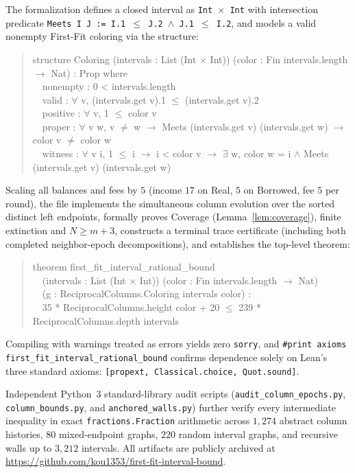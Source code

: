 \documentclass[11pt,a4paper]{article}
\theoremstyle{remark}
\begin{document}
The formalization defines a closed interval as \texttt{Int $\times$ Int} with intersection predicate \texttt{Meets I J := I.1 $\le$ J.2 $\wedge$ J.1 $\le$ I.2}, and models a valid nonempty First-Fit coloring via the structure:
\begin{quote}\small\ttfamily
structure Coloring (intervals : List (Int $\times$ Int)) (color : Fin intervals.length $\to$ Nat) : Prop where\\
\ \ nonempty : 0 < intervals.length\\
\ \ valid    : $\forall$ v, (intervals.get v).1 $\le$ (intervals.get v).2\\
\ \ positive : $\forall$ v, 1 $\le$ color v\\
\ \ proper   : $\forall$ v w, v $\ne$ w $\to$ Meets (intervals.get v) (intervals.get w) $\to$ color v $\ne$ color w\\
\ \ witness  : $\forall$ v i, 1 $\le$ i $\to$ i < color v $\to$ $\exists$ w, color w = i $\wedge$ Meets (intervals.get v) (intervals.get w)
\end{quote}
Scaling all balances and fees by $5$ (income $17$ on Real, $5$ on Borrowed, fee $5$ per round), the file implements the simultaneous column evolution over the sorted distinct left endpoints, formally proves Coverage (Lemma~\ref{lem:coverage}), finite extinction and $N \ge m + 3$, constructs a terminal trace certificate (including both completed neighbor-epoch decompositions), and establishes the top-level theorem:
\begin{quote}\small\ttfamily
theorem first\_fit\_interval\_rational\_bound\\
\ \ (intervals : List (Int $\times$ Int)) (color : Fin intervals.length $\to$ Nat)\\
\ \ (g : ReciprocalColumns.Coloring intervals color) :\\
\ \ 35 * ReciprocalColumns.height color + 20 $\le$ 239 * ReciprocalColumns.depth intervals
\end{quote}
Compiling with warnings treated as errors yields zero \texttt{sorry}, and \texttt{\#print axioms first\_fit\_interval\_rational\_bound} confirms dependence solely on Lean's three standard axioms: \texttt{[propext, Classical.choice, Quot.sound]}.

Independent Python~3 standard-library audit scripts (\texttt{audit\_column\_epochs.py}, \texttt{column\_bounds.py}, and \texttt{anchored\_walls.py}) further verify every intermediate inequality in exact \texttt{fractions.Fraction} arithmetic across $1{,}274$ abstract column histories, $80$ mixed-endpoint graphs, $220$ random interval graphs, and recursive walls up to $3{,}212$ intervals. All artifacts are publicly archived at \url{https://github.com/kou1353/first-fit-interval-bound}.
\end{document}
